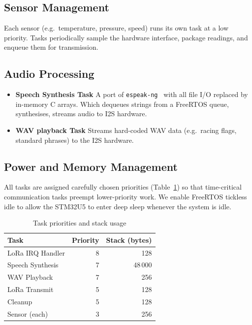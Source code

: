 \subsection{Sensor Management}
Each sensor (e.g.\ temperature, pressure, speed) runs its own task at a low priority. Tasks periodically sample the hardware interface, package readings, and enqueue them for transmission.

\subsection{Audio Processing}
\begin{itemize}
  \item \textbf{Speech Synthesis Task}
    A port of \texttt{espeak-ng}~\cite{espeakng} with all file I/O replaced by in-memory C arrays. Which dequeues strings from a FreeRTOS queue, synthesises, streams audio to I2S hardware.
  \item \textbf{WAV playback Task}
    Streams hard-coded WAV data (e.g.\ racing flags, standard phrases) to the I2S hardware.
\end{itemize}

\subsection{Power and Memory Management}

All tasks are assigned carefully chosen priorities (Table~\ref{tab:priorities}) so that time-critical communication tasks preempt lower-priority work. We enable FreeRTOS tickless idle to allow the STM32U5 to enter deep sleep whenever the system is idle.

\begin{table}[H]
  \centering
  \caption{Task priorities and stack usage}
  \label{tab:priorities}
  \begin{tabular}{lrr}
    \hline
    Task                     & Priority & Stack (bytes) \\
    \hline
    LoRa IRQ Handler         & 8        & 128            \\
    Speech Synthesis         & 7        & 48\,000        \\
    WAV Playback             & 7        & 256            \\
    LoRa Transmit            & 5        & 128            \\
    Cleanup                  & 5        & 128            \\
    Sensor (each)            & 3        & 256            \\
    \hline
  \end{tabular}
\end{table}
